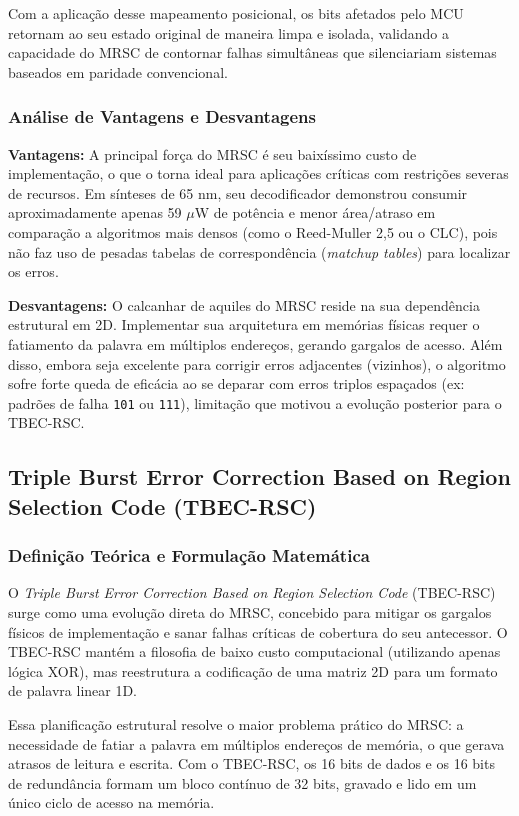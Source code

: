 \documentclass[12pt,a4paper]{article}
\begin{document}
Com a aplicação desse mapeamento posicional, os bits afetados pelo MCU retornam ao seu estado original de maneira limpa e isolada, validando a capacidade do MRSC de contornar falhas simultâneas que silenciariam sistemas baseados em paridade convencional.
\subsubsection{Análise de Vantagens e Desvantagens}

\textbf{Vantagens:} A principal força do MRSC é seu baixíssimo custo de implementação, o que o torna ideal para aplicações críticas com restrições severas de recursos. Em sínteses de 65 nm, seu decodificador demonstrou consumir aproximadamente apenas 59 $\mu$W de potência e menor área/atraso em comparação a algoritmos mais densos (como o Reed-Muller 2,5 ou o CLC), pois não faz uso de pesadas tabelas de correspondência (\textit{matchup tables}) para localizar os erros.

\textbf{Desvantagens:} O calcanhar de aquiles do MRSC reside na sua dependência estrutural em 2D. Implementar sua arquitetura em memórias físicas requer o fatiamento da palavra em múltiplos endereços, gerando gargalos de acesso. Além disso, embora seja excelente para corrigir erros adjacentes (vizinhos), o algoritmo sofre forte queda de eficácia ao se deparar com erros triplos espaçados (ex: padrões de falha \texttt{101} ou \texttt{111}), limitação que motivou a evolução posterior para o TBEC-RSC.

\subsection{Triple Burst Error Correction Based on Region Selection Code (TBEC-RSC)}

\subsubsection{Definição Teórica e Formulação Matemática}

O \textit{Triple Burst Error Correction Based on Region Selection Code} (TBEC-RSC) surge como uma evolução direta do MRSC, concebido para mitigar os gargalos físicos de implementação e sanar falhas críticas de cobertura do seu antecessor. O TBEC-RSC mantém a filosofia de baixo custo computacional (utilizando apenas lógica XOR), mas reestrutura a codificação de uma matriz 2D para um formato de palavra linear 1D.

Essa planificação estrutural resolve o maior problema prático do MRSC: a necessidade de fatiar a palavra em múltiplos endereços de memória, o que gerava atrasos de leitura e escrita. Com o TBEC-RSC, os 16 bits de dados e os 16 bits de redundância formam um bloco contínuo de 32 bits, gravado e lido em um único ciclo de acesso na memória.
\end{document}
